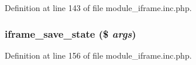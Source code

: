 Definition at line 143 of file module\_\-iframe.inc.php.

\hypertarget{module__iframe_8inc_8php_a3034fcc475334b511b91932918fcfe57}{
\subsubsection[{iframe\_\-save\_\-state}]{\setlength{\rightskip}{0pt plus 5cm}iframe\_\-save\_\-state (\$ {\em args})}}
\label{module__iframe_8inc_8php_a3034fcc475334b511b91932918fcfe57}


Definition at line 156 of file module\_\-iframe.inc.php.

